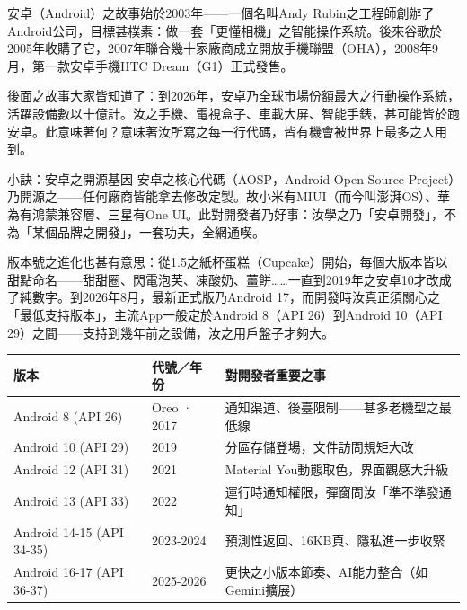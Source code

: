 


安卓（Android）之故事始於2003年——一個名叫Andy Rubin之工程師創辦了Android公司，目標甚樸素：做一套「更懂相機」之智能操作系統。後來谷歌於2005年收購了它，2007年聯合幾十家廠商成立開放手機聯盟（OHA），2008年9月，第一款安卓手機HTC Dream（G1）正式發售。

後面之故事大家皆知道了：到2026年，安卓乃全球市場份額最大之行動操作系統，活躍設備數以十億計。汝之手機、電視盒子、車載大屏、智能手錶，甚可能皆於跑安卓。此意味著何？意味著汝所寫之每一行代碼，皆有機會被世界上最多之人用到。

\begin{tcbinfo}{小訣：安卓之開源基因}
安卓之核心代碼（AOSP，Android Open Source Project）乃開源之——任何廠商皆能拿去修改定製。故小米有MIUI（而今叫澎湃OS）、華為有鴻蒙兼容層、三星有One UI。此對開發者乃好事：汝學之乃「安卓開發」，不為「某個品牌之開發」，一套功夫，全網通喫。

\end{tcbinfo}

版本號之進化也甚有意思：從1.5之紙杯蛋糕（Cupcake）開始，每個大版本皆以甜點命名——甜甜圈、閃電泡芙、凍酸奶、薑餅……一直到2019年之安卓10才改成了純數字。到2026年8月，最新正式版乃Android 17，而開發時汝真正須關心之「最低支持版本」，主流App一般定於Android 8（API 26）到Android 10（API 29）之間——支持到幾年前之設備，汝之用戶盤子才夠大。

\begin{center}
\begin{tabularx}{\linewidth}{|X|X|X|}
\hline
\textbf{版本} & \textbf{代號／年份} & \textbf{對開發者重要之事} \tabularnewline
\hline
Android 8 (API 26) & Oreo · 2017 & 通知渠道、後臺限制——甚多老機型之最低線 \tabularnewline
Android 10 (API 29) & 2019 & 分區存儲登場，文件訪問規矩大改 \tabularnewline
Android 12 (API 31) & 2021 & Material You動態取色，界面觀感大升級 \tabularnewline
Android 13 (API 33) & 2022 & 運行時通知權限，彈窗問汝「準不準發通知」 \tabularnewline
Android 14-15 (API 34-35) & 2023-2024 & 預測性返回、16KB頁、隱私進一步收緊 \tabularnewline
Android 16-17 (API 36-37) & 2025-2026 & 更快之小版本節奏、AI能力整合（如Gemini擴展） \tabularnewline
\hline
\end{tabularx}
\end{center}

